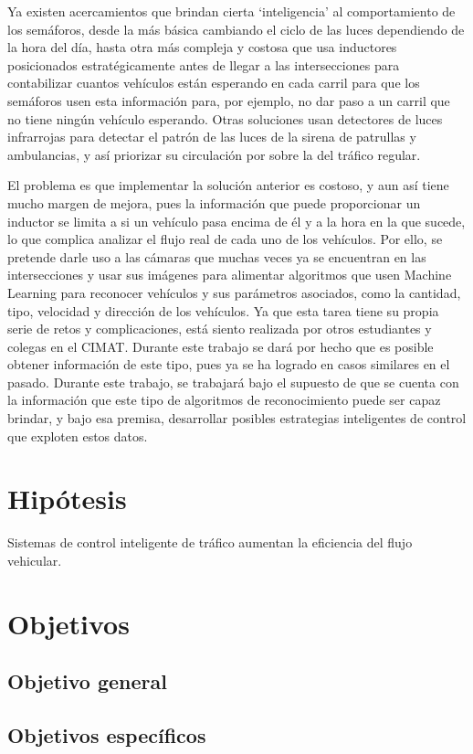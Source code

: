 Ya existen acercamientos que brindan cierta `inteligencia' al
comportamiento de los semáforos, desde la más básica cambiando el ciclo
de las luces dependiendo de la hora del día, hasta otra más compleja y
costosa que usa inductores posicionados estratégicamente antes de llegar
a las intersecciones para contabilizar cuantos vehículos están esperando
en cada carril para que los semáforos usen esta información para, por
ejemplo, no dar paso a un carril que no tiene ningún vehículo esperando.
Otras soluciones usan detectores de luces infrarrojas para detectar el
patrón de las luces de la sirena de patrullas y ambulancias, y así
priorizar su circulación por sobre la del tráfico regular.

El problema es que implementar la solución anterior es costoso, y aun
así tiene mucho margen de mejora, pues la información que puede
proporcionar un inductor se limita a si un vehículo pasa encima de él y
a la hora en la que sucede, lo que complica analizar el flujo real de
cada uno de los vehículos. Por ello, se pretende darle uso a las cámaras
que muchas veces ya se encuentran en las intersecciones y usar sus
imágenes para alimentar algoritmos que usen Machine Learning para
reconocer vehículos y sus parámetros asociados, como la cantidad, tipo,
velocidad y dirección de los vehículos. Ya que esta tarea tiene su
propia serie de retos y complicaciones, está siento realizada por otros
estudiantes y colegas en el CIMAT. Durante este trabajo se dará por
hecho que es posible obtener información de este tipo, pues ya se ha
logrado en casos similares en el pasado. Durante este trabajo, se
trabajará bajo el supuesto de que se cuenta con la información que este
tipo de algoritmos de reconocimiento puede ser capaz brindar, y bajo esa
premisa, desarrollar posibles estrategias inteligentes de control que
exploten estos datos.

\hypertarget{hipuxf3tesis}{%
\section{Hipótesis}\label{hipuxf3tesis}}

Sistemas de control inteligente de tráfico aumentan la eficiencia del
flujo vehicular.

\hypertarget{objetivos}{%
\section{Objetivos}\label{objetivos}}

\hypertarget{objetivo-general}{%
\subsection{Objetivo general}\label{objetivo-general}}

\hypertarget{objetivos-especuxedficos}{%
\subsection{Objetivos específicos}\label{objetivos-especuxedficos}}

\clearpage %
